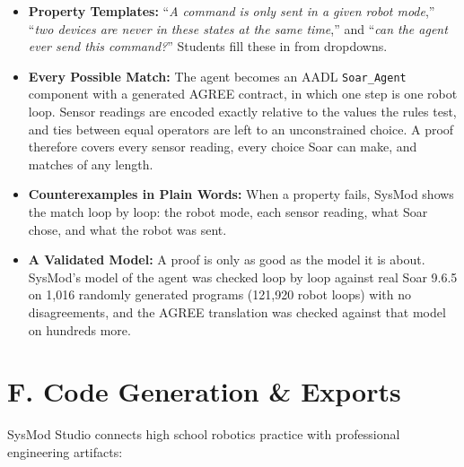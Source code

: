 \documentclass[11pt,letterpaper]{article}
\begin{document}
\begin{itemize}
    \item \textbf{Property Templates:} ``\emph{A command is only sent in a given robot mode},'' ``\emph{two devices are never in these states at the same time},'' and ``\emph{can the agent ever send this command?}'' Students fill these in from dropdowns.
    \item \textbf{Every Possible Match:} The agent becomes an AADL \texttt{Soar\_Agent} component with a generated AGREE contract, in which one step is one robot loop. Sensor readings are encoded exactly relative to the values the rules test, and ties between equal operators are left to an unconstrained choice. A proof therefore covers every sensor reading, every choice Soar can make, and matches of any length.
    \item \textbf{Counterexamples in Plain Words:} When a property fails, SysMod shows the match loop by loop: the robot mode, each sensor reading, what Soar chose, and what the robot was sent.
    \item \textbf{A Validated Model:} A proof is only as good as the model it is about. SysMod's model of the agent was checked loop by loop against real Soar 9.6.5 on 1,016 randomly generated programs (121,920 robot loops) with no disagreements, and the AGREE translation was checked against that model on hundreds more.
\end{itemize}

\newpage

\section*{\Large {F. Code Generation \& Exports}}\label{sec:F}
SysMod Studio connects high school robotics practice with professional engineering artifacts:
\end{document}
